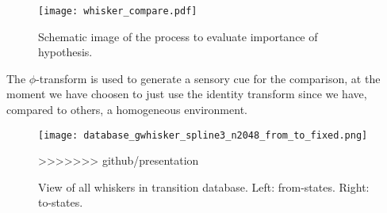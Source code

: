 \begin{figure}
  \centering
  \texttt{[image: whisker\_compare.pdf]}
  \caption{Schematic image of the process to evaluate importance of hypothesis.}
  \label{fig:whisker_compare}
\end{figure}

The $\phi$-transform is used to generate a sensory cue for the comparison, at the moment we have choosen to just use the identity transform since we have, compared to others, a homogeneous environment.

\begin{figure}
  \centering
  \texttt{[image: database\_gwhisker\_spline3\_n2048\_from\_to\_fixed.png]}
  \caption{View of all whiskers in transition database. Left: from-states. Right: to-states.}
>>>>>>> github/presentation
  \label{fig:database}
\end{figure}
